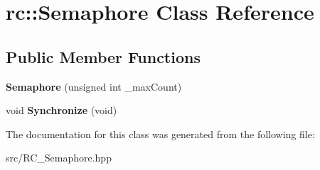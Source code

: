 \hypertarget{classrc_1_1Semaphore}{\section{rc\+:\+:Semaphore Class Reference}
\label{classrc_1_1Semaphore}
}
\subsection*{Public Member Functions}
\begin{DoxyCompactItemize}
\item 
\hypertarget{classrc_1_1Semaphore_a6260f609fc0499bf67a7e5c77198f746}{{\bfseries Semaphore} (unsigned int \+\_\+max\+Count)}\label{classrc_1_1Semaphore_a6260f609fc0499bf67a7e5c77198f746}

\item 
\hypertarget{classrc_1_1Semaphore_a0fe2e6a5966af9b2e03dc5f8ffd64aff}{void {\bfseries Synchronize} (void)}\label{classrc_1_1Semaphore_a0fe2e6a5966af9b2e03dc5f8ffd64aff}

\end{DoxyCompactItemize}


The documentation for this class was generated from the following file\+:\begin{DoxyCompactItemize}
\item 
src/R\+C\+\_\+\+Semaphore.\+hpp\end{DoxyCompactItemize}
